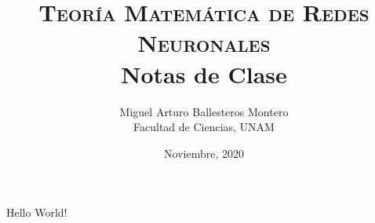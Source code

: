 \documentclass[12pt,a4paper]{book}
\title{%
\textsc{Teoría Matemática de Redes Neuronales}\\[0.5em]
\large Notas de Clase%
}
\author{%
Miguel Arturo Ballesteros Montero\\[0.5em]
Facultad de Ciencias, UNAM%
}
\date{Noviembre, 2020}
\begin{document}
Hello World!
\end{document}
